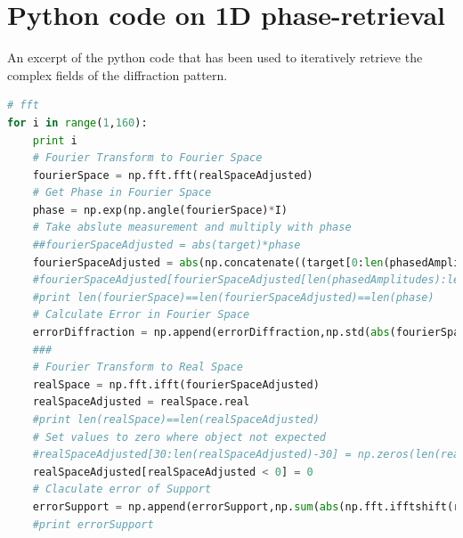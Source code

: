 \section{Python code on 1D phase-retrieval}\label{sec:1d-phase-retrieval-code}
An excerpt of the python code that has been used to iteratively retrieve the complex fields of the diffraction pattern.
\begin{lstlisting}[language=Python,frame=single,basicstyle=\footnotesize]
# fft
for i in range(1,160):
	print i
	# Fourier Transform to Fourier Space
	fourierSpace = np.fft.fft(realSpaceAdjusted)
	# Get Phase in Fourier Space
	phase = np.exp(np.angle(fourierSpace)*I)
	# Take abslute measurement and multiply with phase
	##fourierSpaceAdjusted = abs(target)*phase
	fourierSpaceAdjusted = abs(np.concatenate((target[0:len(phasedAmplitudes)],fourierSpace[len(phasedAmplitudes):len(phasedAmplitudes)*3],target[len(phasedAmplitudes)*3:len(target)]),axis=0))*phase
	#fourierSpaceAdjusted[fourierSpaceAdjusted[len(phasedAmplitudes):len(phasedAmplitudes)*3] > phasedAmplitudes[len(phasedAmplitudes)-1]] = phasedAmplitudes[len(phasedAmplitudes)-1]
	#print len(fourierSpace)==len(fourierSpaceAdjusted)==len(phase)
	# Calculate Error in Fourier Space
	errorDiffraction = np.append(errorDiffraction,np.std(abs(fourierSpace[0:len(phasedAmplitudes)]) - abs(target[0:len(phasedAmplitudes)])))
	###
	# Fourier Transform to Real Space
	realSpace = np.fft.ifft(fourierSpaceAdjusted)
	realSpaceAdjusted = realSpace.real
	#print len(realSpace)==len(realSpaceAdjusted)
	# Set values to zero where object not expected
	#realSpaceAdjusted[30:len(realSpaceAdjusted)-30] = np.zeros(len(realSpaceAdjusted)-60)
	realSpaceAdjusted[realSpaceAdjusted < 0] = 0
	# Claculate error of Support
	errorSupport = np.append(errorSupport,np.sum(abs(np.fft.ifftshift(realSpace)[0:len(realSpace)/2 - 30])))
	#print errorSupport
\end{lstlisting}
%
%
%

